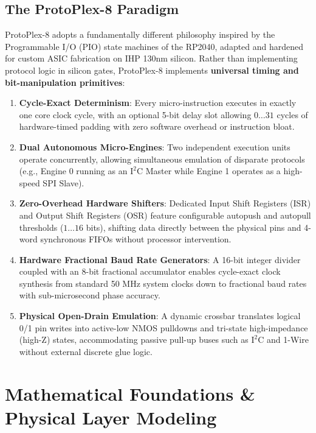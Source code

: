 \documentclass[11pt,a4paper]{article}
\begin{document}
\subsection{The ProtoPlex-8 Paradigm}
ProtoPlex-8 adopts a fundamentally different philosophy inspired by the Programmable I/O (PIO) state machines of the RP2040, adapted and hardened for custom ASIC fabrication on IHP 130nm silicon. Rather than implementing protocol logic in silicon gates, ProtoPlex-8 implements \textbf{universal timing and bit-manipulation primitives}:
\begin{enumerate}
    \item \textbf{Cycle-Exact Determinism}: Every micro-instruction executes in exactly one core clock cycle, with an optional 5-bit delay slot allowing $0 \dots 31$ cycles of hardware-timed padding with zero software overhead or instruction bloat.
    \item \textbf{Dual Autonomous Micro-Engines}: Two independent execution units operate concurrently, allowing simultaneous emulation of disparate protocols (e.g., Engine 0 running as an $\text{I}^2\text{C}$ Master while Engine 1 operates as a high-speed SPI Slave).
    \item \textbf{Zero-Overhead Hardware Shifters}: Dedicated Input Shift Registers (ISR) and Output Shift Registers (OSR) feature configurable autopush and autopull thresholds ($1 \dots 16$ bits), shifting data directly between the physical pins and 4-word synchronous FIFOs without processor intervention.
    \item \textbf{Hardware Fractional Baud Rate Generators}: A 16-bit integer divider coupled with an 8-bit fractional accumulator enables cycle-exact clock synthesis from standard 50 MHz system clocks down to fractional baud rates with sub-microsecond phase accuracy.
    \item \textbf{Physical Open-Drain Emulation}: A dynamic crossbar translates logical 0/1 pin writes into active-low NMOS pulldowns and tri-state high-impedance (high-Z) states, accommodating passive pull-up buses such as $\text{I}^2\text{C}$ and 1-Wire without external discrete glue logic.
\end{enumerate}

\section{Mathematical Foundations \& Physical Layer Modeling}
\end{document}
